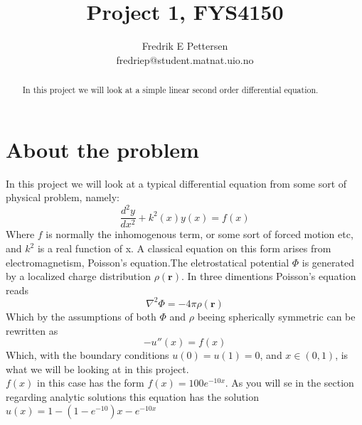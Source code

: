 \documentclass[a4paper,english, 10pt, twoside]{article}
\title{Project 1, FYS4150}
\author{Fredrik E Pettersen\\ fredriep@student.matnat.uio.no}
\begin{document}
\maketitle

\begin{abstract}
In this project we will look at a simple linear second order differential equation.
\end{abstract}

\section*{About the problem}
In this project we will look at a typical differential equation from some sort of physical problem, namely:
$$
\frac{d^2y}{dx^2} + k^2(x)y(x) = f(x)
$$
Where $f$ is normally the inhomogenous term, or some sort of forced motion etc, and $k^2$ is a real function of x. A classical 
equation on this form arises from electromagnetism, Poisson's equation.The eletrostatical potential $\Phi$ is generated by a 
localized charge distribution $\rho(\mathbf{r})$. In three dimentions Poisson's equation reads
$$
\nabla^2\Phi = -4\pi \rho(\mathbf{r})
$$
Which by the assumptions of both $\Phi$ and $\rho$ beeing spherically symmetric can be rewritten as
$$
-u''(x) = f(x)
$$
Which, with the boundary conditions $u(0)=u(1)=0$, and $x\in(0,1)$, is what we will be looking at in this project.\\
$f(x)$ in this case has the form $f(x) = 100e^{-10x}$. As you will se in the section regarding analytic solutions
this equation has the solution $u(x) = 1-(1-e^{-10})x-e^{-10x}$
\end{document}
